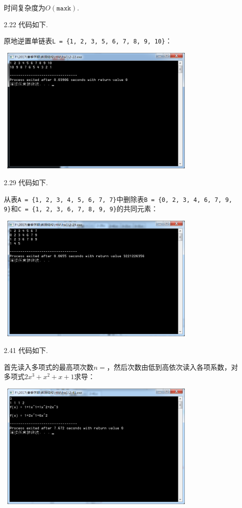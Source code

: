 \documentclass[11pt,a4paper]{ctexart}
\begin{document}
\begin{enumerate}
	时间复杂度为$O(\mathtt{maxk})$.
	\item[2.22]
	代码如下.
	
	
	原地逆置单链表\texttt{L = \{1, 2, 3, 5, 6, 7, 8, 9, 10\}}：
	
	\mbox{
		\includegraphics[width=0.75\textwidth]{hw1/screenshot/2-22}}
	\item[2.29]
	代码如下.
	
	
	从表\texttt{A = \{1, 2, 3, 4, 5, 6, 7, 7\}}中删除表\texttt{B = \{0, 2, 3, 4, 6, 7, 9, 9\}}和\texttt{C = \{1, 2, 3, 6, 7, 8, 9, 9\}}的共同元素：
	
	\mbox{
		\includegraphics[width=0.75\textwidth]{hw1/screenshot/2-29}}
	\item[2.41]
	代码如下.
	
	
	首先读入多项式的最高项次数$n=$，然后次数由低到高依次读入各项系数，对多项式$2x^3+x^2+x+1$求导：
	
	\mbox{
		\includegraphics[width=0.75\textwidth]{hw1/screenshot/2-41}}
\end{enumerate}
\end{document}
